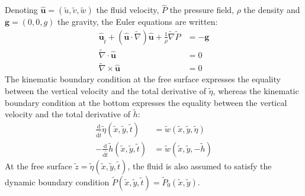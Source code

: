 \documentclass[11pt,a4paper]{article}
\begin{document}
			Denoting $\mathbf{\hat{u}} = (\tilde{u},\tilde{v}, \tilde{w})$ the fluid velocity, $\hat{P}$ the pressure field, $\rho$ the density and $\mathbf{g} = (0,0,g)$ the gravity, the Euler equations are written: 
			\begin{align}
						\displaystyle \mathbf{\hat{u}}_{\tilde{t}} + (\mathbf{\hat{u}} \cdot \tilde{\nabla}) \mathbf{\hat{u}} + \frac{1}{\rho} \tilde{\nabla}\tilde{P} &=  -\mathbf{g} \label{Euler1} \\
						\tilde{\nabla} \cdot \mathbf{\hat{u}} & = 0 \\
						\tilde{\nabla} \times \mathbf{\hat{u}} & = 0 \label{Euler3}
			\end{align}
			The kinematic boundary condition at the free surface expresses the equality between the vertical velocity and the total derivative of $\tilde{\eta}$, whereas the kinematic boundary condition at the bottom expresses the equality between the vertical velocity and the total derivative of $\tilde{h}$:
			\begin{align}
				\frac{\mathrm{d}}{\mathrm{d}\tilde{t}} \tilde{\eta}(\tilde{x},\tilde{y},\tilde{t}) & = \tilde{w}(\tilde{x},\tilde{y},\tilde{\eta}) \label{BC1} \\
				-\frac{\mathrm{d}}{\mathrm{d}\tilde{t}} \tilde{h}(\tilde{x},\tilde{y},\tilde{t}) & = \tilde{w}(\tilde{x},\tilde{y},-\tilde{h}) \label{BC2}
			\end{align}
			At the free surface $\tilde{z} = \tilde{\eta}(\tilde{x},\tilde{y},\tilde{t})$,	the fluid is also assumed to satisfy the dynamic boundary condition $\tilde{P}(\tilde{x},\tilde{y},\tilde{t}) = \tilde{P}_0(\tilde{x},\tilde{y})$.
			
\end{document}
